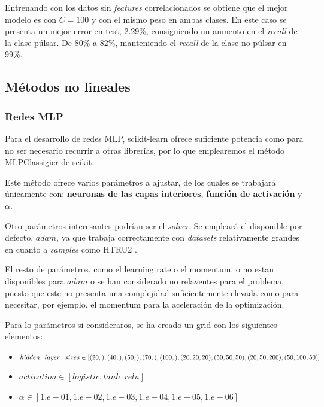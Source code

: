 \documentclass[a4paper]{article} %
\begin{document}
Entrenando con los datos sin \textit{features} correlacionados se obtiene que el mejor modelo es con $C = 100$ y con el mismo peso en ambas clases. En este caso se presenta un mejor error en test, 2.29\%, consiguiendo un aumento en el \textit{recall} de la clase púlsar. De 80\% a 82\%, manteniendo el \textit{recall} de la clase no púlsar en 99\%.\vspace{5mm}

\subsection{Métodos no lineales}
\subsubsection{Redes MLP}

Para el desarrollo de redes MLP, scikit-learn ofrece suficiente potencia como para no ser necesario recurrir a otras librerías, por lo que emplearemos el método MLPClassigier de scikit.\vspace{5mm}

Este método ofrece varios parámetros a ajustar, de los cuales se trabajará únicamente con: \textbf{neuronas de las capas interiores}, \textbf{función de activación} y \textbf{$\alpha$}.\vspace{5mm}

Otro parámetros interesantes podrían ser el \textit{solver}. Se empleará el disponible por defecto, $adam$, ya que trabaja correctamente con \textit{datasets} relativamente grandes en cuanto a \textit{samples} como HTRU2 \cite{Scikit:MLPClassifier}.\vspace{5mm}

El resto de parámetros, como el learning rate o el momentum, o no estan disponibles para $adam$ o se han considerado no relaventes para el problema, puesto que este no presenta una complejidad suficientemente elevada como para necesitar, por ejemplo, el momentum para la aceleración de la optimización.\vspace{5mm}

Para lo parámetros si consideraros, se ha creado un grid con los siguientes elementos:
\begin{itemize}
    \item $hidden\_layer\_sizes \in [(20,), (40,), (50,), (70,), (100,), (20,20,20), \\(50,50,50), (20,50,200), (50,100,50)]$
    \item $activation \in [logistic, tanh, relu]$
    \item $\alpha \in [1.e-01, 1.e-02, 1.e-03, 1.e-04, 1.e-05, 1.e-06]$
\end{itemize}
\end{document}
